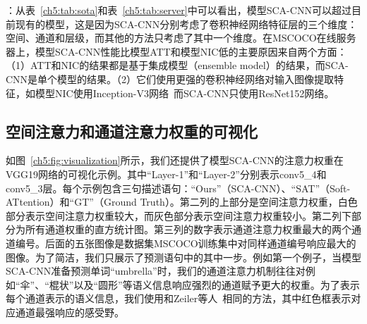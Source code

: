 \begin{table}[t]
\centering
{}
\caption{不同图像描述语句生成算法在数据集MSCOCO的在线服务器上的性能对比} 
\label{ch5:tab:server}
\end{table}

\textbf{}：从表~\ref{ch5:tab:sota}和表~\ref{ch5:tab:server}中可以看出，模型SCA-CNN可以超过目前现有的模型，这是因为SCA-CNN分别考虑了卷积神经网络特征层的三个维度：空间、通道和层级，而其他的方法只考虑了其中一个维度。在MSCOCO在线服务器上，模型SCA-CNN性能比模型ATT和模型NIC低的主要原因来自两个方面：（1）ATT和NIC的结果都是基于集成模型（ensemble model）的结果，而SCA-CNN是单个模型的结果。（2）它们使用更强的卷积神经网络对输入图像提取特征，如模型NIC使用Inception-V3网络~\cite{szegedy2016rethinking}而SCA-CNN只使用ResNet152网络。


\subsection{空间注意力和通道注意力权重的可视化}
如图~\ref{ch5:fig:visualization}所示，我们还提供了模型SCA-CNN的注意力权重在VGG19网络的可视化示例。其中“Layer-1”和“Layer-2”分别表示conv5\_4和conv5\_3层。每个示例包含三句描述语句：“Ours”（SCA-CNN）、“SAT”（Soft-ATtention）和“GT”（Ground Truth）。第二列的上部分是空间注意力权重，白色部分表示空间注意力权重较大，而灰色部分表示空间注意力权重较小。第二列下部分为所有通道权重的直方统计图。第三列的数字表示通道注意力权重最大的两个通道编号。后面的五张图像是数据集MSCOCO训练集中对同样通道编号响应最大的图像。为了简洁，我们只展示了预测语句中的其中一步。例如第一个例子，当模型SCA-CNN准备预测单词“umbrella”时，我们的通道注意力机制往往对例如“伞”、“棍状”以及“圆形”等语义信息响应强烈的通道赋予更大的权重。为了表示每个通道表示的语义信息，我们使用和Zeiler等人~\cite{zeiler2014visualizing}相同的方法，其中红色框表示对应通道最强响应的感受野。



